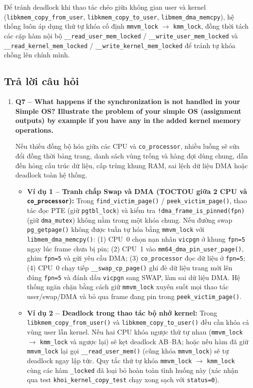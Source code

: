 \documentclass[12pt,a4paper]{article}
\begin{document}
	Để tránh deadlock khi thao tác chéo giữa không gian user và kernel (\texttt{libkmem\_copy\_from\_user}, \texttt{libkmem\_copy\_to\_user}, \texttt{libmem\_dma\_memcpy}), hệ thống luôn áp dụng thứ tự khóa cố định \texttt{mmvm\_lock} $\to$ \texttt{kmm\_lock}, đồng thời tách các cặp hàm nội bộ \texttt{\_\_read\_user\_mem\_locked} / \texttt{\_\_write\_user\_mem\_locked} và \texttt{\_\_read\_kernel\_mem\_locked} / \texttt{\_\_write\_kernel\_mem\_locked} để tránh tự khóa chồng lên chính mình.

	\subsection{Trả lời câu hỏi}
	\begin{enumerate}
	    \item \textbf{Q7 -- What happens if the synchronization is not handled in your Simple OS? Illustrate the problem of your simple OS (assignment outputs) by example if you have any in the added kernel memory operations.}

	    Nếu thiếu đồng bộ hóa giữa các CPU và \texttt{co\_processor}, nhiều luồng sẽ sửa đổi đồng thời bảng trang, danh sách vùng trống và hàng đợi dùng chung, dẫn đến hỏng cấu trúc dữ liệu, cấp trùng khung RAM, sai lệch dữ liệu DMA hoặc deadlock toàn hệ thống.

	    \begin{itemize}[leftmargin=*]
	        \item \textbf{Ví dụ 1 -- Tranh chấp Swap và DMA (TOCTOU giữa 2 CPU và \texttt{co\_processor}):} Trong \texttt{find\_victim\_page()} / \texttt{peek\_victim\_page()}, thao tác đọc PTE (giữ \texttt{pgtbl\_lock}) và kiểm tra \texttt{!dma\_frame\_is\_pinned(fpn)} (giữ \texttt{dma\_mutex}) không nằm trong một khóa chung. Nếu đường swap \texttt{pg\_getpage()} không được tuần tự hóa bằng \texttt{mmvm\_lock} với \texttt{libmem\_dma\_memcpy()}: (1) CPU~0 chọn nạn nhân \texttt{vicpgn} ở khung \texttt{fpn=5} ngay lúc frame chưa bị pin; (2) CPU~1 vào \texttt{mm64\_dma\_pin\_user\_page()}, ghim \texttt{fpn=5} và gửi yêu cầu DMA; (3) \texttt{co\_processor} đọc dữ liệu ở \texttt{fpn=5}; (4) CPU~0 chạy tiếp \texttt{\_\_swap\_cp\_page()} ghi đè dữ liệu trang mới lên đúng \texttt{fpn=5} và đánh dấu \texttt{vicpgn} sang SWAP, làm sai dữ liệu DMA. Hệ thống ngăn chặn bằng cách giữ \texttt{mmvm\_lock} xuyên suốt mọi thao tác user/swap/DMA và bỏ qua frame đang pin trong \texttt{peek\_victim\_page()}.
	        \item \textbf{Ví dụ 2 -- Deadlock trong thao tác bộ nhớ kernel:} Trong \texttt{libkmem\_copy\_from\_user()} và \texttt{libkmem\_copy\_to\_user()} đều cần khóa cả vùng user lẫn kernel. Nếu hai CPU khóa ngược thứ tự nhau (\texttt{mmvm\_lock} $\to$ \texttt{kmm\_lock} và ngược lại) sẽ kẹt deadlock AB--BA; hoặc nếu hàm đã giữ \texttt{mmvm\_lock} lại gọi \texttt{\_\_read\_user\_mem()} (cũng khóa \texttt{mmvm\_lock}) sẽ tự deadlock ngay lập tức. Quy tắc thứ tự khóa \texttt{mmvm\_lock} $\to$ \texttt{kmm\_lock} cùng các hàm \texttt{\_locked} đã loại bỏ hoàn toàn tình huống này (xác nhận qua test \texttt{khoi\_kernel\_copy\_test} chạy xong sạch với \texttt{status=0}).
	    \end{itemize}
	\end{enumerate}
	\endgroup
\end{document}
